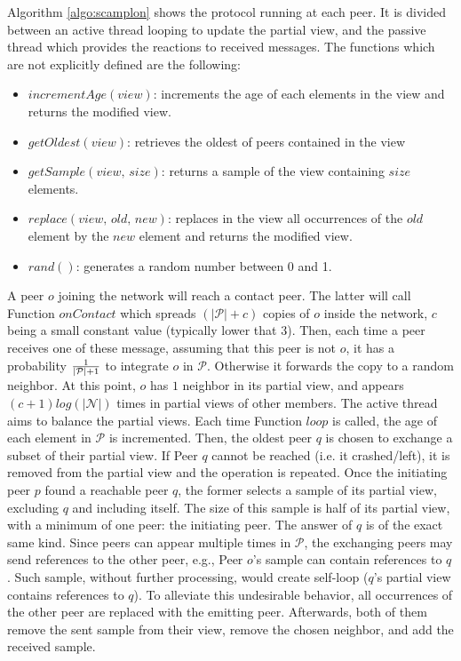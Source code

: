 \begin{asparadesc}
\item [Algorithm]\ref{algo:scamplon} shows the \SCAMPLON{} protocol running at
  each peer. It is divided between an active thread looping to update the
  partial view, and the passive thread which provides the reactions to received
  messages. The functions which are not explicitly defined are the following:
  \begin{itemize}
  \item $incrementAge(view)$: increments the age of each elements in the view
    and returns the modified view.
  \item $getOldest(view)$: retrieves the oldest of peers contained in the view
  \item $getSample(view, \, size)$: returns a sample of the view containing
    $size$ elements.
  \item $replace(view,\,old,\,new)$: replaces in the view all occurrences of
    the $old$ element by the $new$ element and returns the modified view.
  \item $rand()$: generates a random number between 0 and 1.
  \end{itemize}
  A peer $o$ joining the network will reach a contact peer. The latter will
  call Function $onContact$ which spreads $(|\mathcal{P}|+c)$ copies of $o$
  inside the network, $c$ being a small constant value (typically lower that
  $3$). Then, each time a peer receives one of these message, assuming that
  this peer is not $o$, it has a probability $1\over{|\mathcal{P}|+1}$ to
  integrate $o$ in $\mathcal{P}$. Otherwise it forwards the copy to a random
  neighbor.  At this point, $o$ has $1$ neighbor in its partial view, and
  appears $(c+1)log(|\mathcal{N}|)$ times in partial views of other
  members. The active thread aims to balance the partial views. Each time
  Function $loop$ is called, the age of each element in $\mathcal{P}$ is
  incremented. Then, the oldest peer $q$ is chosen to exchange a subset of
  their partial view. If Peer $q$ cannot be reached (i.e. it crashed/left), it
  is removed from the partial view and the operation is repeated. Once the
  initiating peer $p$ found a reachable peer $q$, the former selects a sample
  of its partial view, excluding $q$ and including itself. The size of this
  sample is half of its partial view, with a minimum of one peer: the
  initiating peer. The answer of $q$ is of the exact same kind. Since peers can
  appear multiple times in $\mathcal{P}$, the exchanging peers may send
  references to the other peer, e.g., Peer $o$'s sample can contain references
  to $q$. Such sample, without further processing, would create self-loop
  ($q$'s partial view contains references to $q$). To alleviate this
  undesirable behavior, all occurrences of the other peer are replaced with the
  emitting peer.  Afterwards, both of them remove the sent sample from their
  view, remove the chosen neighbor, and add the received sample.
\end{asparadesc}


